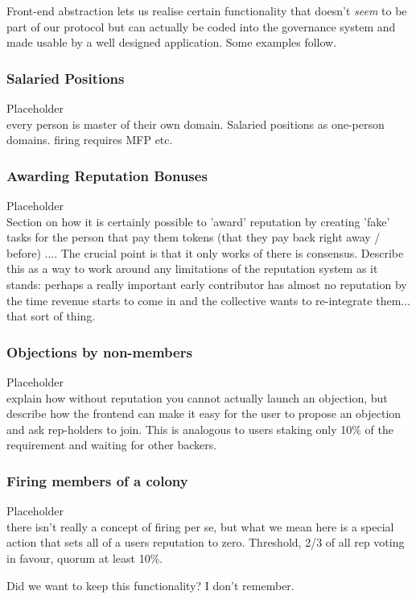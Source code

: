 Front-end abstraction lets us realise certain functionality that doesn't \emph{seem} to be part of our protocol but can actually be coded into the governance system and made usable by a well designed application. Some examples follow.
%

\subsubsection{Salaried Positions}\label{sec:salary}

%
Placeholder\\
every person is master of their own domain. 
Salaried positions as one-person domains.
firing requires MFP etc.
%


\subsubsection{Awarding Reputation Bonuses}

%
Placeholder\\
Section on how it is certainly possible to 'award' reputation by creating 'fake' tasks for the person that pay them tokens (that they pay back right away / before) ....
The crucial point is that it only works of there is consensus.
Describe this as a way to work around any limitations of the reputation system as it stands: perhaps a really important early contributor has almost no reputation by the time revenue starts to come in and the collective wants to re-integrate them... that sort of thing.
%

\subsubsection{Objections by non-members}
%
Placeholder\\
explain how without reputation you cannot actually launch an objection, but describe how the frontend can make it easy for the user to propose an objection and ask rep-holders to join. This is analogous to users staking only 10\% of the requirement and waiting for other backers.
%

\subsubsection{Firing members of a colony}

%
Placeholder\\
there isn't really a concept of firing per se, but what we mean here is a special action that sets all of a users reputation to zero.
Threshold, 2/3 of all rep voting in favour, quorum at least 10\%. 
%

Did we want to keep this functionality? I don't remember.

